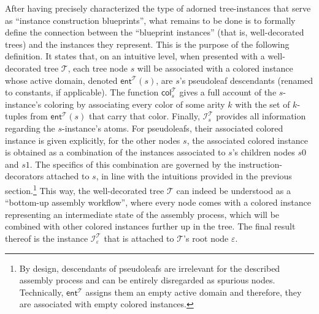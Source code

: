 \documentclass[10pt,a4paper]{amsart}
\theoremstyle{definition}
\numberwithin{equation}{section}
\theoremstyle{plain}
\theoremstyle{definition}
\theoremstyle{myexample}
\theoremstyle{plain}
\theoremstyle{definition}
\newcommand{\instance}{\mathcal{I}}
\newcommand{\inst}{\instance}
\newcommand{\fcn}[1]{\mathsf{#1}}
\begin{document}

After having precisely characterized the type of adorned tree-instances that serve as ``instance construction blueprints'', what remains to be done is to formally define the connection between the ``blueprint instances'' (that is, well-decorated trees) and the instances they represent. This is the purpose of the following definition. It states that, on an intuitive level, when presented with a well-decorated tree $\mathcal{T}$, each tree node $s$ will be associated with a colored instance whose active domain, denoted $\fcn{ent}^\mathcal{T}\!(s)$, are $s$'s pseudoleaf descendants (renamed to constants, if applicable). The function $\fcn{col}^{\mathcal{T}}_s$ gives a full account of the $s$-instance's coloring by associating every color of some arity $k$ with the set of $k$-tuples from $\fcn{ent}^\mathcal{T}\!(s)$ that carry that color. Finally, $\inst^{\mathcal{T}}_s$ provides all information regarding the $s$-instance's atoms. For pseudoleafs, their associated colored instance is given explicitly, for the other nodes $s$, the associated colored instance is obtained as a combination of the instances associated to $s$'s children nodes $s0$ and $s1$. The specifics of this combination are governed by the instruction-decorators attached to $s$, in line with the intuitions provided in the previous section.\footnote{By design, descendants of pseudoleafs are irrelevant for the described assembly process and can be entirely disregarded as spurious nodes. Technically, $\fcn{ent}^\mathcal{T}$ assigns them an empty active domain and therefore, they are associated with empty colored instances.} This way, the well-decorated tree $\mathcal{T}$ can indeed be understood as a ``bottom-up assembly workflow'', where every node comes with a colored instance representing an intermediate state of the assembly process, which will be combined with other colored instances further up in the tree. The final result thereof is the instance $\inst^{\mathcal{T}}_\varepsilon$ that is attached to $\mathcal{T}$'s root node $\varepsilon$.    
\end{document}
